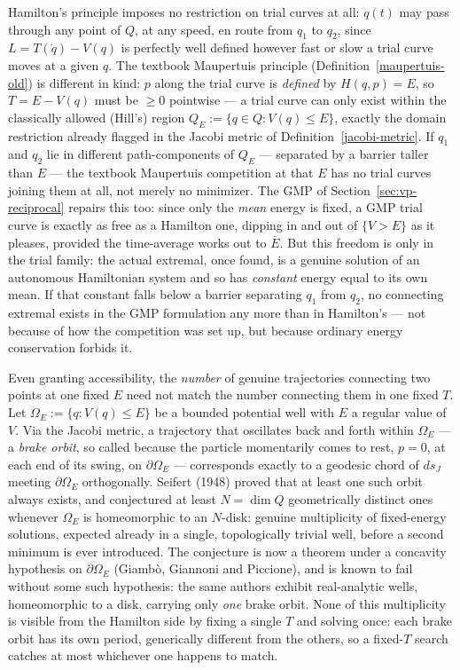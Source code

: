 Hamilton's principle imposes no restriction on trial curves at all: $q(t)$ may
pass through any point of $Q$, at any speed, en route from $q_1$ to $q_2$,
since $L=T(\dot q)-V(q)$ is perfectly well defined however fast or slow a trial
curve moves at a given $q$. The textbook Maupertuis principle
(Definition~\ref{maupertuis-old}) is different in kind: $p$ along the trial
curve is \emph{defined} by $H(q,p)=E$, so $T=E-V(q)$ must be $\ge0$ pointwise
--- a trial curve can only exist within the classically allowed (Hill's) region
$Q_E:=\{q\in Q: V(q)\le E\}$, exactly the domain restriction already flagged in
the Jacobi metric of Definition~\ref{jacobi-metric}. If $q_1$ and $q_2$ lie
in different path-components of $Q_E$ --- separated by a barrier taller than
$E$ --- the textbook Maupertuis competition at that $E$ has no trial curves
joining them at all, not merely no minimizer. The GMP of
Section~\ref{sec:vp-reciprocal} repairs this too: since only the \emph{mean}
energy is fixed, a GMP trial curve is exactly as free as a Hamilton one,
dipping in and out of $\{V>E\}$ as it pleases, provided the time-average works
out to $\bar E$. But this freedom is only in the trial family: the actual
extremal, once found, is a genuine solution of an autonomous Hamiltonian system
and so has \emph{constant} energy equal to its own mean. If that constant falls
below a barrier separating $q_1$ from $q_2$, no connecting extremal exists in
the GMP formulation any more than in Hamilton's --- not because of how the
competition was set up, but because ordinary energy conservation forbids it.

Even granting accessibility, the \emph{number} of genuine trajectories
connecting two points at one fixed $E$ need not match the number connecting
them in one fixed $T$. Let $\Omega_E:=\{q:V(q)\le E\}$ be a bounded potential
well with $E$ a regular value of $V$. Via the Jacobi metric, a trajectory that
oscillates back and forth within $\Omega_E$ --- a \emph{brake orbit}, so called
because the particle momentarily comes to rest, $p=0$, at each end of its
swing, on $\partial\Omega_E$ --- corresponds exactly to a geodesic chord of
$ds_J$ meeting $\partial\Omega_E$ orthogonally. Seifert (1948) proved that at
least one such orbit always exists, and conjectured at least $N=\dim Q$
geometrically distinct ones whenever $\Omega_E$ is homeomorphic to an $N$-disk:
genuine multiplicity of fixed-energy solutions, expected already in a single,
topologically trivial well, before a second minimum is ever introduced. The
conjecture is now a theorem under a concavity hypothesis on $\partial\Omega_E$
(Giambò, Giannoni and Piccione), and is known to fail without some such
hypothesis: the same authors exhibit real-analytic wells, homeomorphic to a
disk, carrying only \emph{one} brake orbit. None of this multiplicity is
visible from the Hamilton side by fixing a single $T$ and solving once: each
brake orbit has its own period, generically different from the others, so a
fixed-$T$ search catches at most whichever one happens to match.

